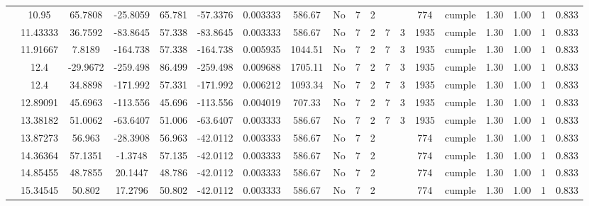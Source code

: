 \begin{table}[H]
{\begin{tabular}{|c|c|c|c|c|c|r|c|c|c|c|c|c|c|c|c|c|c|c|}
\cline{2-19}    & 10.95 & 65.7808 & -25.8059 & 65.781 & -57.3376 & 0.003333 & 586.67 & No  & 7   & 2   &     &     & 774 & \cellcolor[rgb]{ .776,  .937,  .808}cumple & 1.30 & 1.00 & 1   & 0.833 \bigstrut\\
\cline{2-19}    & 11.43333 & 36.7592 & -83.8645 & 57.338 & -83.8645 & 0.003333 & 586.67 & No  & 7   & 2   & 7   & 3   & 1935 & \cellcolor[rgb]{ .776,  .937,  .808}cumple & 1.30 & 1.00 & 1   & 0.833 \bigstrut\\
\cline{2-19}    & 11.91667 & 7.8189 & -164.738 & 57.338 & -164.738 & 0.005935 & 1044.51 & No  & 7   & 2   & 7   & 3   & 1935 & \cellcolor[rgb]{ .776,  .937,  .808}cumple & 1.30 & 1.00 & 1   & 0.833 \bigstrut\\
\cline{2-19}    & \cellcolor[rgb]{ .851,  .882,  .949}12.4 & -29.9672 & -259.498 & 86.499 & -259.498 & 0.009688 & 1705.11 & No  & 7   & 2   & 7   & 3   & 1935 & \cellcolor[rgb]{ .776,  .937,  .808}cumple & 1.30 & 1.00 & 1   & 0.833 \bigstrut\\
\cline{2-19}    & \cellcolor[rgb]{ .851,  .882,  .949}12.4 & 34.8898 & -171.992 & 57.331 & -171.992 & 0.006212 & 1093.34 & No  & 7   & 2   & 7   & 3   & 1935 & \cellcolor[rgb]{ .776,  .937,  .808}cumple & 1.30 & 1.00 & 1   & 0.833 \bigstrut\\
\cline{2-19}    & 12.89091 & 45.6963 & -113.556 & 45.696 & -113.556 & 0.004019 & 707.33 & No  & 7   & 2   & 7   & 3   & 1935 & \cellcolor[rgb]{ .776,  .937,  .808}cumple & 1.30 & 1.00 & 1   & 0.833 \bigstrut\\
\cline{2-19}    & 13.38182 & 51.0062 & -63.6407 & 51.006 & -63.6407 & 0.003333 & 586.67 & No  & 7   & 2   & 7   & 3   & 1935 & \cellcolor[rgb]{ .776,  .937,  .808}cumple & 1.30 & 1.00 & 1   & 0.833 \bigstrut\\
\cline{2-19}    & 13.87273 & 56.963 & -28.3908 & 56.963 & -42.0112 & 0.003333 & 586.67 & No  & 7   & 2   &     &     & 774 & \cellcolor[rgb]{ .776,  .937,  .808}cumple & 1.30 & 1.00 & 1   & 0.833 \bigstrut\\
\cline{2-19}    & 14.36364 & 57.1351 & -1.3748 & 57.135 & -42.0112 & 0.003333 & 586.67 & No  & 7   & 2   &     &     & 774 & \cellcolor[rgb]{ .776,  .937,  .808}cumple & 1.30 & 1.00 & 1   & 0.833 \bigstrut\\
\cline{2-19}    & 14.85455 & 48.7855 & 20.1447 & 48.786 & -42.0112 & 0.003333 & 586.67 & No  & 7   & 2   &     &     & 774 & \cellcolor[rgb]{ .776,  .937,  .808}cumple & 1.30 & 1.00 & 1   & 0.833 \bigstrut\\
\cline{2-19}    & 15.34545 & 50.802 & 17.2796 & 50.802 & -42.0112 & 0.003333 & 586.67 & No  & 7   & 2   &     &     & 774 & \cellcolor[rgb]{ .776,  .937,  .808}cumple & 1.30 & 1.00 & 1   & 0.833 \bigstrut\\

\end{tabular}}
\end{table}
